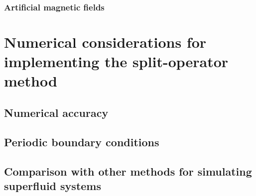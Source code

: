 \subsubsection{Artificial magnetic fields}

\section{Numerical considerations for implementing the split-operator method}

\subsection{Numerical accuracy}

\subsection{Periodic boundary conditions}

\subsection{Comparison with other methods for simulating superfluid systems}
